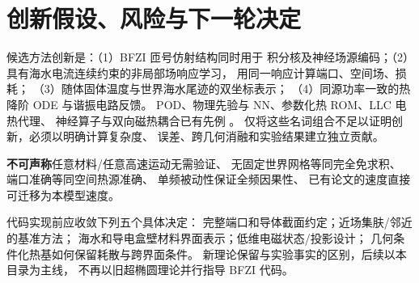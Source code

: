 \section{创新假设、风险与下一轮决定}\label{sec:decisions}
候选方法创新是：（1）BFZI 匝号仿射结构同时用于
积分核及神经场源编码；（2）具有海水电流连续约束的非局部场响应学习，
用同一响应计算端口、空间场、损耗；
（3）随体固体温度与世界海水尾迹的双坐标表示；
（4）同源功率一致的热降阶 ODE 与谐振电路反馈。
POD、物理先验与 NN、参数化热 ROM、LLC 电热代理、
神经算子与双向磁热耦合已有先例
\cite{wang2026,dam2026,zhu2026,xie2026,yuan2024,chen2025,dini2023,barba2026}。
仅将这些名词组合不足以证明创新，必须以明确计算复杂度、
误差、跨几何消融和实验结果建立独立贡献。

\textbf{不可声称}任意材料/任意高速运动无需验证、
无固定世界网格等同完全免求积、
端口准确等同空间热源准确、
单频被动性保证全频因果性、
已有论文的速度直接可迁移为本模型速度。

代码实现前应收敛下列五个具体决定：
完整端口和导体截面约定；近场集肤/邻近的基准方法；
海水和导电盒壁材料界面表示；低维电磁状态/投影设计；
几何条件化热基如何保留耗散与跨界面条件。
新理论保留与实验事实的区别，后续以本目录为主线，
不再以旧超椭圆理论并行指导 BFZI 代码。
